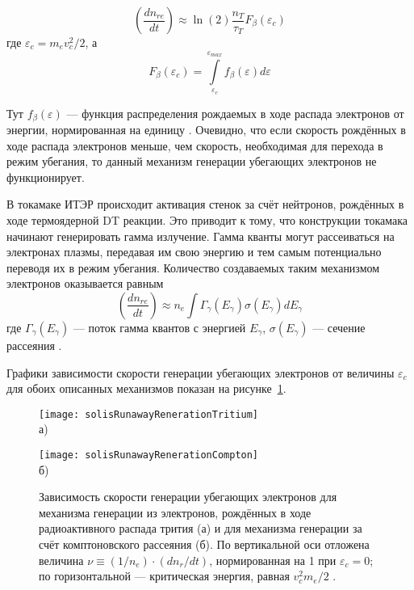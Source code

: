 \begin{equation*}
  \left( \frac{ d n_{re} }{ d t } \right) \approx \ln(2) \frac{ n_T }{ \tau_T } F_{\beta}(\varepsilon_c)
\end{equation*}
где $\varepsilon_c = m_e v_c^2 / 2$, а 
\begin{equation*}
  F_{\beta}(\varepsilon_c) = \int\limits_{\varepsilon_c}^{ \varepsilon_{max} } f_{\beta}(\varepsilon) d\varepsilon 
\end{equation*}

Тут $ f_{\beta}(\varepsilon) $ --- функция распределения рождаемых в ходе распада электронов от энергии, нормированная на единицу \cite{MartinSolis2017}. Очевидно, что если скорость рождённых в ходе распада электронов меньше, чем скорость, необходимая для перехода в режим убегания, то данный механизм генерации убегающих электронов не функционирует.

В токамаке ИТЭР происходит активация стенок за счёт нейтронов, рождённых в ходе термоядерной DT реакции. Это приводит к тому, что конструкции токамака начинают генерировать гамма излучение. Гамма кванты могут рассеиваться на электронах плазмы, передавая им свою энергию и тем самым потенциально переводя их в режим убегания. Количество создаваемых таким механизмом электронов оказывается равным 
\begin{equation*}
  \left( \frac{ d n_{re} }{ d t } \right) \approx n_e \int \Gamma_{\gamma}(E_{\gamma}) \sigma(E_{\gamma}) d E_{\gamma} 
\end{equation*}
где $\Gamma_{\gamma}(E_{\gamma})$ --- поток гамма квантов с энергией $E_{\gamma}$, $\sigma(E_{\gamma})$ --- сечение рассеяния \cite{MartinSolis2017}.

Графики зависимости скорости генерации убегающих электронов от величины $\varepsilon_c$ для обоих описанных механизмов показан на рисунке~\ref{fig:solisGeneration}.

\begin{figure}[ht]
    \begin{minipage}[b][][b]{0.49\linewidth}\centering
        \texttt{[image: solisRunawayRenerationTritium]} \\ а)
    \end{minipage}
    \hfill
    \begin{minipage}[b][][b]{0.49\linewidth}\centering
        \texttt{[image: solisRunawayRenerationCompton]} \\ б)
    \end{minipage}
    \caption{ Зависимость скорости генерации убегающих электронов для механизма генерации из электронов, рождённых в ходе радиоактивного распада трития (а) и для механизма генерации за счёт комптоновского рассеяния (б). По вертикальной оси отложена величина $\nu \equiv (1/n_e) \cdot ( dn_r / dt ) $, нормированная на 1 при $\varepsilon_c = 0$; по горизонтальной --- критическая энергия, равная $v_c^2 m_e / 2 $ \cite{MartinSolis2017}. }
    \label{fig:solisGeneration}
\end{figure}


